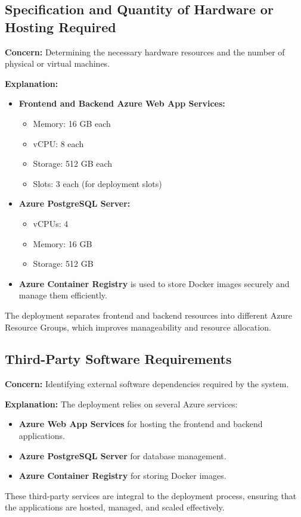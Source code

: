 \documentclass[a4paper,12pt]{article}
\begin{document}
\subsection{Specification and Quantity of Hardware or Hosting Required}
\textbf{Concern:} Determining the necessary hardware resources and the number of physical or virtual machines.

\textbf{Explanation:}
\begin{itemize}
    \item \textbf{Frontend and Backend Azure Web App Services:}
    \begin{itemize}
        \item Memory: 16 GB each
        \item vCPU: 8 each
        \item Storage: 512 GB each
        \item Slots: 3 each (for deployment slots)
    \end{itemize}
    \item \textbf{Azure PostgreSQL Server:}
    \begin{itemize}
        \item vCPUs: 4
        \item Memory: 16 GB
        \item Storage: 512 GB
    \end{itemize}
    \item \textbf{Azure Container Registry} is used to store Docker images securely and manage them efficiently.
\end{itemize}
The deployment separates frontend and backend resources into different Azure Resource Groups, which improves manageability and resource allocation.

\subsection{Third-Party Software Requirements}
\textbf{Concern:} Identifying external software dependencies required by the system.

\textbf{Explanation:} The deployment relies on several Azure services:
\begin{itemize}
    \item \textbf{Azure Web App Services} for hosting the frontend and backend applications.
    \item \textbf{Azure PostgreSQL Server} for database management.
    \item \textbf{Azure Container Registry} for storing Docker images.
\end{itemize}
These third-party services are integral to the deployment process, ensuring that the applications are hosted, managed, and scaled effectively.
\end{document}
